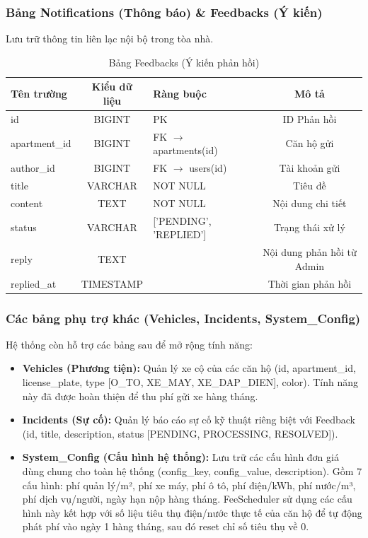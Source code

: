 \documentclass[12pt,a4paper]{article}
\begin{document}
\subsubsection{Bảng Notifications (Thông báo) \& Feedbacks (Ý kiến)}
Lưu trữ thông tin liên lạc nội bộ trong tòa nhà.
\begin{table}[H]
    \centering
    \caption{Bảng Feedbacks (Ý kiến phản hồi)}
    \begin{tabularx}{\textwidth}{|L{2.5cm}|c|X|c|}
    \hline
    \textbf{Tên trường} & \textbf{Kiểu dữ liệu} & \textbf{Ràng buộc} & \textbf{Mô tả} \\
    \hline
    id & BIGINT & PK & ID Phản hồi \\
    \hline
    apartment\_id & BIGINT & FK $\rightarrow$ apartments(id) & Căn hộ gửi \\
    \hline
    author\_id & BIGINT & FK $\rightarrow$ users(id) & Tài khoản gửi \\
    \hline
    title & VARCHAR & NOT NULL & Tiêu đề \\
    \hline
    content & TEXT & NOT NULL & Nội dung chi tiết \\
    \hline
    status & VARCHAR & ['PENDING', 'REPLIED'] & Trạng thái xử lý \\
    \hline
    reply & TEXT & & Nội dung phản hồi từ Admin \\
    \hline
    replied\_at & TIMESTAMP & & Thời gian phản hồi \\
    \hline
    \end{tabularx}
\end{table}

\subsubsection{Các bảng phụ trợ khác (Vehicles, Incidents, System\_Config)}
Hệ thống còn hỗ trợ các bảng sau để mở rộng tính năng:
\begin{itemize}
    \item \textbf{Vehicles (Phương tiện):} Quản lý xe cộ của các căn hộ (id, apartment\_id, license\_plate, type [O\_TO, XE\_MAY, XE\_DAP\_DIEN], color). Tính năng này đã được hoàn thiện để thu phí gửi xe hàng tháng.
    \item \textbf{Incidents (Sự cố):} Quản lý báo cáo sự cố kỹ thuật riêng biệt với Feedback (id, title, description, status [PENDING, PROCESSING, RESOLVED]).
    \item \textbf{System\_Config (Cấu hình hệ thống):} Lưu trữ các cấu hình đơn giá dùng chung cho toàn hệ thống (config\_key, config\_value, description). Gồm 7 cấu hình: phí quản lý/m², phí xe máy, phí ô tô, phí điện/kWh, phí nước/m³, phí dịch vụ/người, ngày hạn nộp hàng tháng. FeeScheduler sử dụng các cấu hình này kết hợp với số liệu tiêu thụ điện/nước thực tế của căn hộ để tự động phát phí vào ngày 1 hàng tháng, sau đó reset chỉ số tiêu thụ về 0.
\end{itemize}
\end{document}
